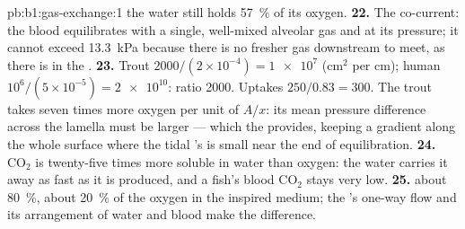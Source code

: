 \begin{solution}{pb:b1:gas-exchange:1}
the water still holds \qty{57}{\%} of its oxygen.
\textbf{22.} The co-current: the blood equilibrates with a single,
well-mixed alveolar gas and  at its pressure; it cannot exceed
\qty{13.3}{kPa} because there is no fresher gas downstream to meet, as
there is in the .
\textbf{23.} Trout $2000/(2\times 10^{-4}) = \num{1e7}$ (cm$^2$ per cm);
human $10^6/(5\times 10^{-5}) = \num{2e10}$: ratio \num{2000}. Uptakes
$250/0.83 = 300$. The trout takes seven times more oxygen per unit of
$A/x$: its mean pressure difference across the lamella must be larger
--- which the  provides, keeping a gradient along the
whole surface where the tidal 's is small near the end of
equilibration.
\textbf{24.} $\mathrm{CO_2}$ is twenty-five times more soluble in
water than oxygen: the water carries it away as fast as it is
produced, and a fish's blood $\mathrm{CO_2}$ stays very low.
\textbf{25.}  about \qty{80}{\%},  about \qty{20}{\%} of the
oxygen in the inspired medium; the 's one-way flow and its
 arrangement of water and blood make the difference.
\end{solution}
